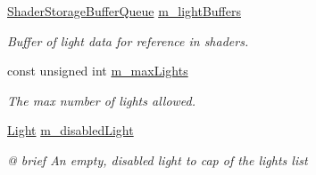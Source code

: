 \begin{Indent}
\begin{DoxyCompactItemize}
\mbox{\hyperlink{classrev_1_1_buffer_queue}{Shader\+Storage\+Buffer\+Queue}} \mbox{\hyperlink{classrev_1_1_lighting_settings_a1b31def0acbff323d96c228206c8c29e}{m\+\_\+light\+Buffers}}
\begin{DoxyCompactList}\small\item\em Buffer of light data for reference in shaders. \end{DoxyCompactList}\item 
\mbox{\label{classrev_1_1_lighting_settings_a3e6955d62c3ec999191356fc07a97f72}} 
const unsigned int \mbox{\hyperlink{classrev_1_1_lighting_settings_a3e6955d62c3ec999191356fc07a97f72}{m\+\_\+max\+Lights}}
\begin{DoxyCompactList}\small\item\em The max number of lights allowed. \end{DoxyCompactList}\item 
\mbox{\label{classrev_1_1_lighting_settings_a981d9328e684ee5a6ad0b3da4d777eef}} 
\mbox{\hyperlink{classrev_1_1_light}{Light}} \mbox{\hyperlink{classrev_1_1_lighting_settings_a981d9328e684ee5a6ad0b3da4d777eef}{m\+\_\+disabled\+Light}}
\begin{DoxyCompactList}\small\item\em @ brief An empty, disabled light to cap of the lights list \end{DoxyCompactList}\end{DoxyCompactItemize}
\end{Indent}
